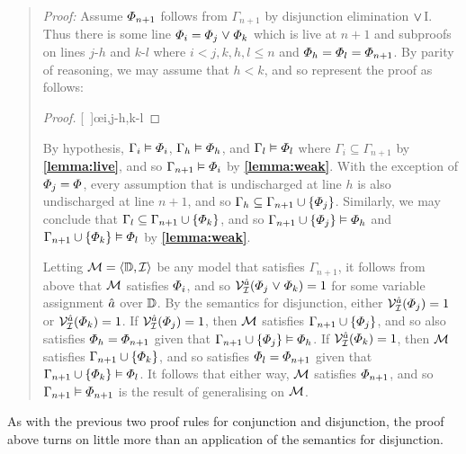 \begin{quote} 
  \textit{Proof:} Assume $\varPhi_{n+1}$ follows from $\Gamma_{n+1}$ by disjunction elimination $\mkern1mu\vee\mkern1mu$I.
  Thus there is some line $\varPhi_i=\varPhi_j\mkern1mu\vee\mkern1mu\varPhi_k$ which is live at $n+1$ and subproofs on lines $j$-$h$ and $k$-$l$ where $i<j,k,h,l\leq n$ and $\varPhi_h=\varPhi_l=\varPhi_{n+1}$.
  By parity of reasoning, we may assume that $h<k$, and so represent the proof as follows:

  \begin{proof}
  \open
     
  \close
  \open
     
  \close
  [\ ]{\metaC}\oe{i,j-h,k-l} 
  \end{proof}

  By hypothesis, $\Gamma_i\vDash \varPhi_i$, $\Gamma_h\vDash \varPhi_h$, and $\Gamma_l\vDash \varPhi_l$ where $\Gamma_i\subseteq \Gamma_{n+1}$ by \textbf{\ref{lemma:live}}, and so $\Gamma_{n+1} \vDash \varPhi_i$ by \textbf{\ref{lemma:weak}}.
  With the exception of $\varPhi_j=\varPhi$, every assumption that is undischarged at line $h$ is also undischarged at line $n+1$, and so $\Gamma_h\subseteq\Gamma_{n+1}\cup\lbrace\varPhi_j\rbrace$.
  Similarly, we may conclude that $\Gamma_l\subseteq\Gamma_{n+1}\cup\lbrace\varPhi_k\rbrace$, and so $\Gamma_{n+1}\cup\lbrace\varPhi_j\rbrace \vDash \varPhi_h$ and $\Gamma_{n+1}\cup\lbrace\varPhi_k\rbrace \vDash \varPhi_l$ by \textbf{\ref{lemma:weak}}.

  Letting $\mathcal{M}=\langle\mathbb{D},\mathcal{I}\rangle$ be any model that satisfies $\Gamma_{n+1}$, it follows from above that $\mathcal{M}$ satisfies $\varPhi_i$, and so $\mathcal{V}_{\mathcal{I}}^{\hat{a}}(\varPhi_j\mkern1mu\vee\mkern1mu\varPhi_k)=1$ for some variable assignment $\hat{a}$ over $\mathbb{D}$.
  By the semantics for disjunction, either $\mathcal{V}_{\mathcal{I}}^{\hat{a}}(\varPhi_j)=1$ or $\mathcal{V}_{\mathcal{I}}^{\hat{a}}(\varPhi_k)=1$.
  If $\mathcal{V}_{\mathcal{I}}^{\hat{a}}(\varPhi_j)=1$, then $\mathcal{M}$ satisfies $\Gamma_{n+1}\cup\lbrace\varPhi_j\rbrace$, and so also satisfies $\varPhi_h=\varPhi_{n+1}$ given that $\Gamma_{n+1}\cup\lbrace\varPhi_j\rbrace \vDash \varPhi_h$. 
  If $\mathcal{V}_{\mathcal{I}}^{\hat{a}}(\varPhi_k)=1$, then $\mathcal{M}$ satisfies $\Gamma_{n+1}\cup\lbrace\varPhi_k\rbrace$, and so satisfies $\varPhi_l=\varPhi_{n+1}$ given that$\Gamma_{n+1}\cup\lbrace\varPhi_k\rbrace \vDash \varPhi_l$.
  It follows that either way, $\mathcal{M}$ satisfies $\varPhi_{n+1}$, and so $\Gamma_{n+1} \vDash \varPhi_{n+1}$ is the result of generalising on $\mathcal{M}$.
\end{quote}

As with the previous two proof rules for conjunction and disjunction, the proof above turns on little more than an application of the semantics for disjunction.




